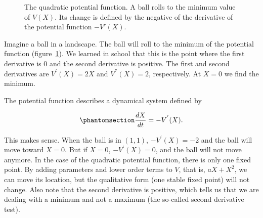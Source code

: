 \documentclass[
  a4paper,
  DIV=11,
  numbers=noendperiod,
  oneside]{scrreprt}
\begin{document}
\begin{figure}


\caption{\label{fig-ch3-img3-old-15}The quadratic potential function. A
ball rolls to the minimum value of \(V(X)\). Its change is defined by
the negative of the derivative of the potential function \(-V'(X)\).}

\end{figure}%

Imagine a ball in a landscape. The ball will roll to the minimum of the
potential function (figure~\ref{fig-ch3-img3-old-15}). We learned in
school that this is the point where the first derivative is 0 and the
second derivative is positive. The first and second derivatives are
\(V^{'}(X) = 2X\) and \(V^{''}(X) = 2\), respectively. At \(X = 0\) we
find the minimum.

The potential function describes a dynamical system defined by

\begin{equation}\phantomsection\label{eq-ch3-2-old-6}{
\frac{dX}{dt} = - V^{'}(X).
}\end{equation}

This makes sense. When the ball is in \((1,1)\), \(- V^{'}(X) = - 2\)
and the ball will move toward \(X = 0\). But if \(X = 0\),
\(- V^{'}(X) = 0\), and the ball will not move anymore. In the case of
the quadratic potential function, there is only one fixed point. By
adding parameters and lower order terms to \(V\), that is,
\({aX + X}^{2}\), we can move its location, but the qualitative form
(one stable fixed point) will not change. Also note that the second
derivative is positive, which tells us that we are dealing with a
minimum and not a maximum (the so-called second derivative test).
\end{document}

